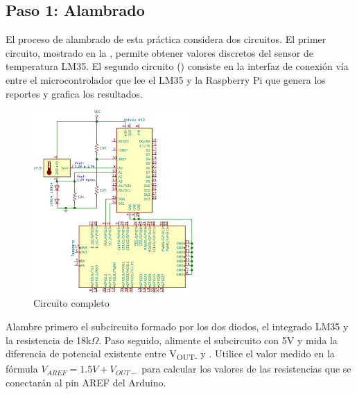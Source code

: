 %
%



\subsection{Paso 1: Alambrado}%
\label{sec:step1}

El proceso de alambrado de esta práctica considera dos circuitos.
El primer circuito, mostrado en la , permite obtener valores discretos del sensor de temperatura LM35.
El segundo circuito () consiste en la interfaz de conexión vía \IIC entre el microcontrolador que lee el LM35 y la Raspberry Pi que genera los reportes y grafica los resultados.

\begin{figure}
	\vspace{-5mm}
	\centering
	\includegraphics[width=0.5\columnwidth,height=7cm,keepaspectratio]{img/lm35-arduino-pi.png}
	\caption{Circuito completo}
	\label{fig:circuit-full} %
\end{figure}

Alambre primero el subcircuito formado por los dos diodos, el integrado LM35 y la resistencia de 18k$\Omega$.
Paso seguido, alimente el subcircuito con 5V y mida la diferencia de potencial existente entre V\textsubscript{OUT-} y \GND{}.
Utilice el valor medido en la fórmula $V_{AREF} = 1.5V + V_{OUT-}$ para calcular los valores de las resistencias que se conectarán al pin AREF del Arduino.

